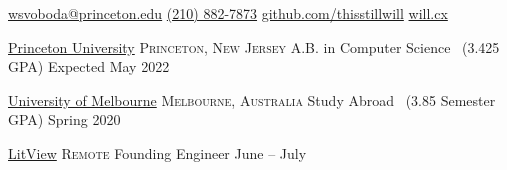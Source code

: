 \documentclass[10pt,letterpaper]{article}
\begin{document}
\sloppy


\nobreakvspace{0.3em}

\noindent\href{mailto:wsvoboda.at.princeton.dot.edu}{wsvoboda\mbox{}@\mbox{}princeton.edu}\sbull
\href{tel:2108827873}{(210) 882-7873}\sbull
\href{https://github.com/thisstillwill}{github.com/thisstillwill}\sbull
\href{https://will.cx}{will.cx}

\spacedhrule{0.9em}{-0.4em}


\headedsection
  {\href{https://www.princeton.edu/}{Princeton University}}
  {\textsc{Princeton, New Jersey}} {%
  \headedsubsection
    {A.B. in Computer Science \textnormal{~(3.425 GPA)}}
    {Expected May 2022}
    {}
}

\headedsection
  {\href{https://www.unimelb.edu.au/}{University of Melbourne}}
  {\textsc{Melbourne, Australia}} {%
  \headedsubsection
    {Study Abroad \textnormal{~(3.85 Semester GPA)}}
    {Spring 2020} {}
}

\spacedhrule{0.5em}{-0.4em}


\headedsection
  {\href{https://www.litview.co/}{LitView}}
  {\textsc{Remote}} {%
  \headedsubsection
    {Founding Engineer}
    {June  -- July }
    {}
}
\end{document}
